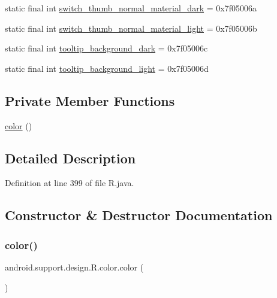 \begin{DoxyCompactItemize}
\item 
static final int \mbox{\hyperlink{classandroid_1_1support_1_1design_1_1_r_1_1color_a04cf39f37dbd30293bcf3e7aff284f44}{switch\+\_\+thumb\+\_\+normal\+\_\+material\+\_\+dark}} = 0x7f05006a
\item 
static final int \mbox{\hyperlink{classandroid_1_1support_1_1design_1_1_r_1_1color_a1606fecd5761dcad3b76d802f1eb2509}{switch\+\_\+thumb\+\_\+normal\+\_\+material\+\_\+light}} = 0x7f05006b
\item 
static final int \mbox{\hyperlink{classandroid_1_1support_1_1design_1_1_r_1_1color_a8de9235b3a7bab6fd87ccdc7107aa832}{tooltip\+\_\+background\+\_\+dark}} = 0x7f05006c
\item 
static final int \mbox{\hyperlink{classandroid_1_1support_1_1design_1_1_r_1_1color_a0e4046f4766953991a1ac2f63727d588}{tooltip\+\_\+background\+\_\+light}} = 0x7f05006d
\end{DoxyCompactItemize}
\subsection*{Private Member Functions}
\begin{DoxyCompactItemize}
\item 
\mbox{\hyperlink{classandroid_1_1support_1_1design_1_1_r_1_1color_a840e74e347e6d975944db3af750754a2}{color}} ()
\end{DoxyCompactItemize}


\subsection{Detailed Description}


Definition at line 399 of file R.\+java.



\subsection{Constructor \& Destructor Documentation}
\mbox{\label{classandroid_1_1support_1_1design_1_1_r_1_1color_a840e74e347e6d975944db3af750754a2}} 
\subsubsection{\texorpdfstring{color()}{color()}}
{\footnotesize\ttfamily android.\+support.\+design.\+R.\+color.\+color (\begin{DoxyParamCaption}{ }\end{DoxyParamCaption})\hspace{0.3cm}{\ttfamily [private]}}



